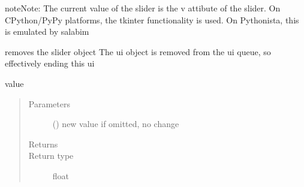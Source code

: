 \documentclass[letterpaper,10pt,english]{sphinxmanual}
\begin{document}
\begin{fulllineitems}
\begin{sphinxadmonition}{note}{Note:}
The current value of the slider is the v attibute of the slider. 
On CPython/PyPy platforms, the tkinter functionality is used. 
On Pythonista, this is emulated by salabim
\end{sphinxadmonition}

\begin{fulllineitems}
\label{\detokenize{Reference:salabim.AnimateSlider.remove}}
removes the slider object 
The ui object is removed from the ui queue,
so effectively ending this ui

\end{fulllineitems}


\begin{fulllineitems}
\label{\detokenize{Reference:salabim.AnimateSlider.v}}
value
\begin{quote}\begin{description}
\item[{Parameters}] \leavevmode
{} () \textendash{} new value 
if omitted, no change

\item[{Returns}] \leavevmode
{}

\item[{Return type}] \leavevmode
float

\end{description}\end{quote}

\end{fulllineitems}


\end{fulllineitems}

\end{document}
